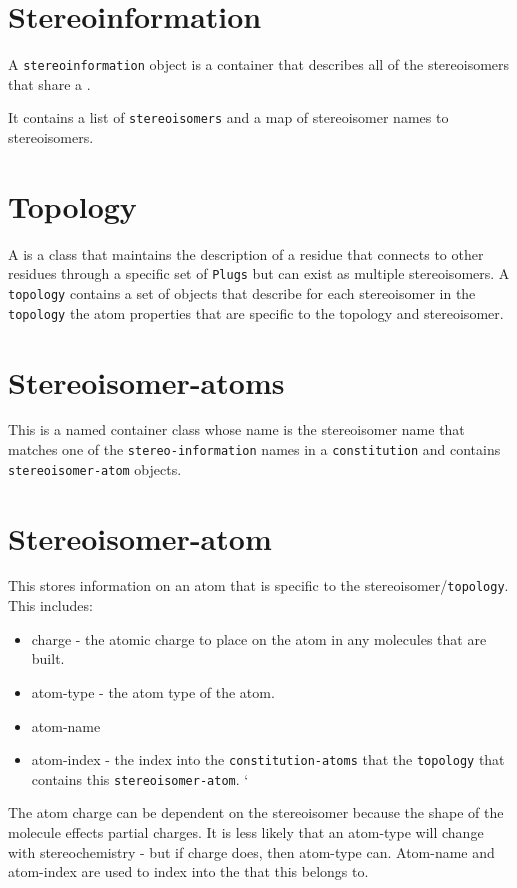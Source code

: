 \section{Stereoinformation}

A \texttt{stereoinformation} object is a container that describes all of the stereoisomers that share a {\constitution}.

It contains a list of \texttt{stereoisomers} and a map of stereoisomer names to stereoisomers.


\section{Topology}

A {\topology} is a class that maintains the description of a residue that connects to other residues through a specific set of \texttt{Plugs} but can exist as multiple stereoisomers.
A \texttt{topology} contains a set of {\stereoisomerAtoms} objects that describe for each stereoisomer in the \texttt{topology} the atom properties that are specific to the topology and stereoisomer.


\section{Stereoisomer-atoms}

This is a named container class whose name is the stereoisomer name that matches one of the \texttt{stereo-information} names in a \texttt{constitution} and contains \texttt{stereoisomer-atom} objects.

\section{Stereoisomer-atom}

This stores information on an atom that is specific to the stereoisomer/\texttt{topology}. 
This includes:
\begin{itemize}
\item
charge - the atomic charge to place on the atom in any molecules that are built.
\item
atom-type - the atom type of the atom.
\item
atom-name
\item
atom-index - the index into the \texttt{constitution-atoms} that the \texttt{topology} that contains this \texttt{stereoisomer-atom}.
`\end{itemize}

 The atom charge can be dependent on the stereoisomer because the shape of the molecule effects partial charges.  It is less likely that an atom-type will change with stereochemistry - but if charge does, then atom-type can.  Atom-name and atom-index are used to index into the {\constitutionAtoms} that this {\stereoisomerAtom} belongs to.

